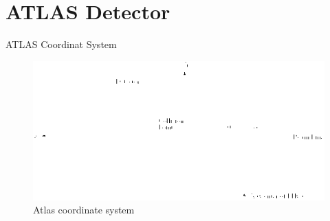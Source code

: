 \documentclass[10pt]{beamer} %
\begin{document}
\section{ATLAS Detector}

\begin{frame}{ATLAS Coordinat System}



\begin{figure}[ht]
        \centering
        \includegraphics[width=1.0\textwidth]{Figs/atlas_coordinate_system.png}
        \caption{Atlas coordinate system}
        \label{fig:atlas-coordinate} 
\end{figure}

\end{frame}
\end{document}
